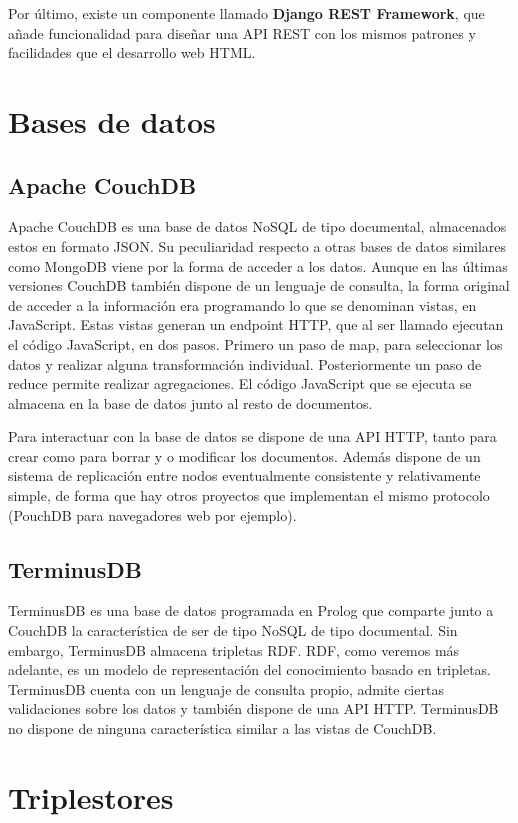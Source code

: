 \documentclass[12pt]{report} %
\begin{document}
Por último, existe un componente llamado \textbf{Django REST Framework}, que añade funcionalidad para diseñar una API REST con los mismos patrones y facilidades que el desarrollo web HTML.

\section{Bases de datos}
\subsection{Apache CouchDB}
Apache CouchDB es una base de datos NoSQL de tipo documental, almacenados estos en formato JSON.\cite{couchdb}
Su peculiaridad respecto a otras bases de datos similares como MongoDB viene por la forma de acceder a los datos.
Aunque en las últimas versiones CouchDB también dispone de un lenguaje de consulta, la forma original de acceder a la información era programando lo que se denominan vistas, en JavaScript.
Estas vistas generan un endpoint HTTP, que al ser llamado ejecutan el código JavaScript, en dos pasos. Primero un paso de map, para seleccionar los datos y realizar alguna transformación individual.
Posteriormente un paso de reduce permite realizar agregaciones. El código JavaScript que se ejecuta se almacena en la base de datos junto al resto de documentos.

Para interactuar con la base de datos se dispone de una API HTTP, tanto para crear como para borrar y o modificar los documentos.
Además dispone de un sistema de replicación entre nodos eventualmente consistente y relativamente simple, de forma que hay otros proyectos que implementan el mismo protocolo (PouchDB para navegadores web por ejemplo).

\subsection{TerminusDB}
TerminusDB es una base de datos programada en Prolog que comparte junto a CouchDB la característica de ser de tipo NoSQL de tipo documental.\cite{terminusdb}
Sin embargo, TerminusDB almacena tripletas RDF. RDF, como veremos más adelante, es un modelo de representación del conocimiento basado en tripletas.
TerminusDB cuenta con un lenguaje de consulta propio, admite ciertas validaciones sobre los datos y también dispone de una API HTTP.
TerminusDB no dispone de ninguna característica similar a las vistas de CouchDB.

\section{Triplestores}
\end{document}

